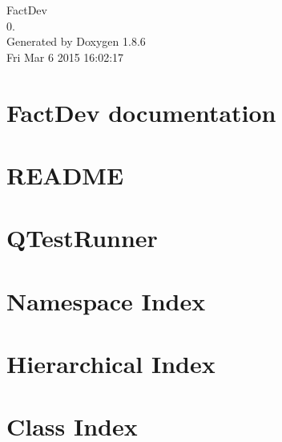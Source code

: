 \documentclass[twoside]{book}
\newcommand{\clearemptydoublepage}{%
  \newpage{\pagestyle{empty}\cleardoublepage}%
}
\begin{document}
\hypersetup{pageanchor=false}
\begin{titlepage}
\vspace*{7cm}
\begin{center}%
{\Large Fact\-Dev \\[1ex]\large 0. }\\
\vspace*{1cm}
{\large Generated by Doxygen 1.8.6}\\
\vspace*{0.5cm}
{\small Fri Mar 6 2015 16:02:17}\\
\end{center}
\end{titlepage}
\clearemptydoublepage
\tableofcontents
\clearemptydoublepage
{}
\hypersetup{pageanchor=true}

\chapter{Fact\-Dev documentation}
\label{index}\hypertarget{index}{}
\chapter{R\-E\-A\-D\-M\-E}
\label{da/d07/md__home_travis_build_FACT-Team_FactDev_src_libs_qt-mustache_README}
\hypertarget{da/d07/md__home_travis_build_FACT-Team_FactDev_src_libs_qt-mustache_README}{}

\chapter{Q\-Test\-Runner}
\label{d7/d95/md__home_travis_build_FACT-Team_FactDev_tests_QTestRunner_README}
\hypertarget{d7/d95/md__home_travis_build_FACT-Team_FactDev_tests_QTestRunner_README}{}

\chapter{Namespace Index}

\chapter{Hierarchical Index}

\chapter{Class Index}

\end{document}

